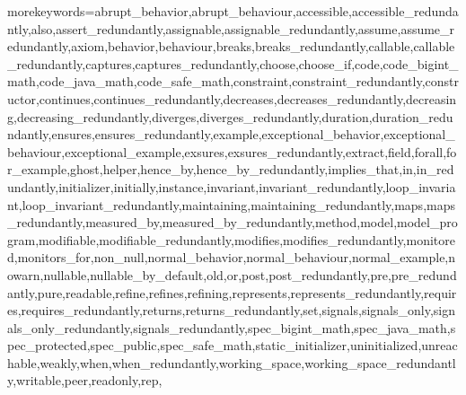   
 { morekeywords={abrupt_behavior,abrupt_behaviour,accessible,accessible_redundantly,also,assert_redundantly,assignable,assignable_redundantly,assume,assume_redundantly,axiom,behavior,behaviour,breaks,breaks_redundantly,callable,callable_redundantly,captures,captures_redundantly,choose,choose_if,code,code_bigint_math,code_java_math,code_safe_math,constraint,constraint_redundantly,constructor,continues,continues_redundantly,decreases,decreases_redundantly,decreasing,decreasing_redundantly,diverges,diverges_redundantly,duration,duration_redundantly,ensures,ensures_redundantly,example,exceptional_behavior,exceptional_behaviour,exceptional_example,exsures,exsures_redundantly,extract,field,forall,for_example,ghost,helper,hence_by,hence_by_redundantly,implies_that,in,in_redundantly,initializer,initially,instance,invariant,invariant_redundantly,loop_invariant,loop_invariant_redundantly,maintaining,maintaining_redundantly,maps,maps_redundantly,measured_by,measured_by_redundantly,method,model,model_program,modifiable,modifiable_redundantly,modifies,modifies_redundantly,monitored,monitors_for,non_null,normal_behavior,normal_behaviour,normal_example,nowarn,nullable,nullable_by_default,old,or,post,post_redundantly,pre,pre_redundantly,pure,readable,refine,refines,refining,represents,represents_redundantly,requires,requires_redundantly,returns,returns_redundantly,set,signals,signals_only,signals_only_redundantly,signals_redundantly,spec_bigint_math,spec_java_math,spec_protected,spec_public,spec_safe_math,static_initializer,uninitialized,unreachable,weakly,when,when_redundantly,working_space,working_space_redundantly,writable,peer,readonly,rep, 
}}

